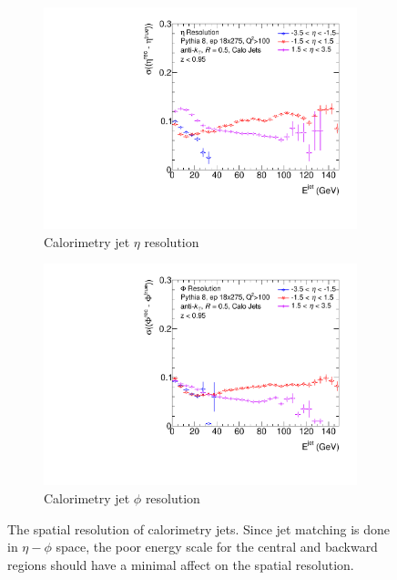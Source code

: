 \begin{figure}
    \centering
    \begin{subfigure}{0.4\textwidth}
        \centering
        \includegraphics[width=\linewidth]{figs/Final_Plots/EtaReso_calo_grouped.pdf}
        \caption{Calorimetry jet $\eta$ resolution}
        \label{fig:calo_eta_resolution}
    \end{subfigure}
    \hfill
    \begin{subfigure}{0.4\textwidth}
        \centering
        \includegraphics[width=\linewidth]{figs/Final_Plots/PhiReso_calo_grouped.pdf}
        \caption{Calorimetry jet $\phi$ resolution}
        \label{fig:calo_phi_resolution}
    \end{subfigure}
    \caption{The spatial resolution of calorimetry jets.  Since jet matching is done in $\eta-\phi$ space, the poor energy scale for the central and backward regions should have a minimal affect on the spatial resolution.}
    \label{fig:calo_spatial_reso_scale}
\end{figure}

